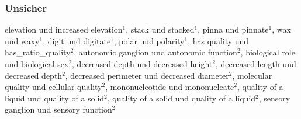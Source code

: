 \subsubsection{Unsicher}
elevation und increased elevation$^1$, stack und stacked$^1$, pinna und pinnate$^1$, wax und
waxy$^1$, digit und digitate$^1$, polar und polarity$^1$, has quality und
has\_ratio\_quality$^2$, autonomic ganglion und autonomic function$^2$, biological
role und biological sex$^2$, decreased depth und decreased height$^2$, decreased
length und decreased depth$^2$, decreased perimeter und decreased diameter$^2$,
molecular quality und cellular quality$^2$, mononucleotide und mononucleate$^2$,
quality of a liquid und quality of a solid$^2$, quality of a solid und quality of a
liquid$^2$, sensory ganglion und sensory function$^2$